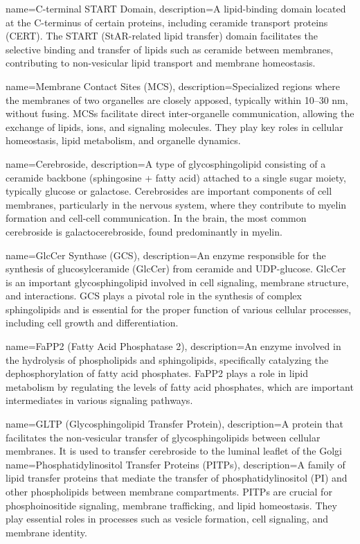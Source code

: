 {
    name={C-terminal START Domain},
    description={A lipid-binding domain located at the C-terminus of certain proteins, including ceramide transport proteins (CERT). The START (StAR-related lipid transfer) domain facilitates the selective binding and transfer of lipids such as ceramide between membranes, contributing to non-vesicular lipid transport and membrane homeostasis.}
}

{
    name={Membrane Contact Sites (MCS)},
    description={Specialized regions where the membranes of two organelles are closely apposed, typically within 10–30 nm, without fusing. MCSs facilitate direct inter-organelle communication, allowing the exchange of lipids, ions, and signaling molecules. They play key roles in cellular homeostasis, lipid metabolism, and organelle dynamics.}
}

{
    name={Cerebroside},
    description={A type of glycosphingolipid consisting of a ceramide backbone (sphingosine + fatty acid) attached to a single sugar moiety, typically glucose or galactose. Cerebrosides are important components of cell membranes, particularly in the nervous system, where they contribute to myelin formation and cell-cell communication. In the brain, the most common cerebroside is galactocerebroside, found predominantly in myelin.}
}

{
    name={GlcCer Synthase (GCS)},
    description={An enzyme responsible for the synthesis of glucosylceramide (GlcCer) from ceramide and UDP-glucose. GlcCer is an important glycosphingolipid involved in cell signaling, membrane structure, and interactions. GCS plays a pivotal role in the synthesis of complex sphingolipids and is essential for the proper function of various cellular processes, including cell growth and differentiation.}
}

{
    name={FaPP2 (Fatty Acid Phosphatase 2)},
    description={An enzyme involved in the hydrolysis of phospholipids and sphingolipids, specifically catalyzing the dephosphorylation of fatty acid phosphates. FaPP2 plays a role in lipid metabolism by regulating the levels of fatty acid phosphates, which are important intermediates in various signaling pathways.}
}

{
    name={GLTP (Glycosphingolipid Transfer Protein)},
    description={A protein that facilitates the non-vesicular transfer of glycosphingolipids between cellular membranes. It is used to transfer cerebroside to the luminal leaflet of the Golgi}
}
{
    name={Phosphatidylinositol Transfer Proteins (PITPs)},
    description={A family of lipid transfer proteins that mediate the transfer of phosphatidylinositol (PI) and other phospholipids between membrane compartments. PITPs are crucial for phosphoinositide signaling, membrane trafficking, and lipid homeostasis. They play essential roles in processes such as vesicle formation, cell signaling, and membrane identity.}
}

